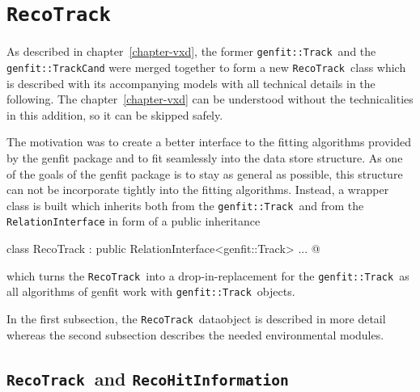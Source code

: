 \newcommand{\RecoTrack}{\texttt{RecoTrack}\ }
\newcommand{\Track}{\texttt{genfit::Track}\ }
\newcommand{\Hit}{\texttt{RecoHitInformation}\ }
\chapter{\texttt{RecoTrack}} \label{chapter-addon}
As described in chapter~\ref{chapter-vxd}, the former \Track and the \texttt{genfit::TrackCand} were merged together to form a new \RecoTrack class which is described with its accompanying models with all technical details in the following. The chapter~\ref{chapter-vxd} can be understood without the technicalities in this addition, so it can be skipped safely.

The motivation was to create a better interface to the fitting algorithms provided by the genfit package and to fit seamlessly into the data store structure. As one of the goals of the genfit package is to stay as general as possible, this structure can not be incorporate tightly into the fitting algorithms. Instead, a wrapper class is built which inherits both from the \Track and from the \texttt{RelationInterface} in form of a public inheritance 
\begin{center}
  \lstset{escapechar=@,style=customC}
  \lstinline@ class RecoTrack : public RelationInterface<genfit::Track> { ... }@
\end{center}
which turns the \RecoTrack into a drop-in-replacement for the \Track as all algorithms of genfit work with \Track objects. 

In the first subsection, the \RecoTrack dataobject is described in more detail whereas the second subsection describes the needed environmental modules.

\section{\RecoTrack and \Hit}

